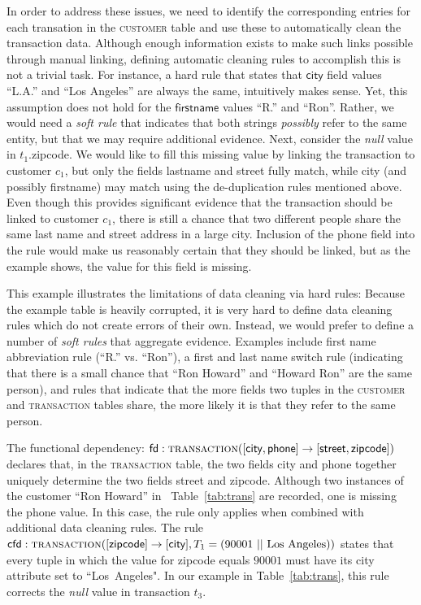 In order to address these issues, we need to identify the corresponding entries for each transation in the \textsc{customer} table and use these to automatically clean the transaction data. Although enough information exists to make such links possible through manual linking, defining automatic cleaning rules to accomplish this is not a trivial task. For instance, a hard rule that states that $\textsf{city}$ field values ``L.A.'' and ``Los Angeles'' are always the same, intuitively makes sense. Yet, this assumption does not hold for the $\textsf{firstname}$ values ``R.'' and ``Ron''. Rather, we would need a \emph{soft rule} that indicates that both strings \emph{possibly} refer to the same entity, but that we may require additional evidence. Next, consider the \emph{null} value in $t_1.$\textsf{zipcode}. We would like to fill this missing value by linking the transaction to customer $c_1$, but only the fields \textsf{lastname} and \textsf{street} fully match, while \textsf{city} (and possibly \textsf{firstname}) may match using the de-duplication rules mentioned above. Even though this provides significant evidence that the transaction should be linked to customer $c_1$, there is still a chance that two different people share the same last name and street address in a large city. Inclusion of the \textsf{phone} field into the rule would make us reasonably certain that they should be linked, but as the example shows, the value for this field is missing. 

This example illustrates the limitations of data cleaning via hard rules: Because the example table is heavily corrupted, it is very hard to define data cleaning rules which do not create errors of their own. Instead, we would prefer to define a number of \emph{soft rules} that aggregate evidence. Examples include first name abbreviation rule (``R.'' vs. ``Ron''), a first and last name switch rule (indicating that there is a small chance that ``Ron Howard'' and ``Howard Ron'' are the same person), and rules that indicate that the more fields two tuples in the \textsc{customer} and \textsc{transaction} tables share, the more likely it is that they refer to the same person. 

The functional dependency: $\textsf{fd}: \textsc{transaction}([\textsf{city}, \textsf{phone}] \rightarrow [\textsf{street}, \textsf{zipcode}])$ declares that, in the \textsc{transaction} table, the two fields \textsf{city} and \textsf{phone} together 
uniquely determine the two fields \textsf{street} and \textsf{zipcode}. Although two instances of the customer ``Ron Howard'' in ~Table~\ref{tab:trans} are recorded, one is missing the \textsf{phone} value. In this case, the rule only applies when combined with additional data cleaning rules. The rule $\textsf{cfd}: \textsc{transaction}([\textsf{zipcode}] \rightarrow [\textsf{city}], T_1 =(90001~||~\text{Los~Angeles}))$ states that every tuple in which the value for \textsf{zipcode} equals $90001$ must have its \textsf{city} attribute set to ``Los~Angeles". In our example in Table~\ref{tab:trans}, this rule corrects the \emph{null} value in transaction $t_3$. 

